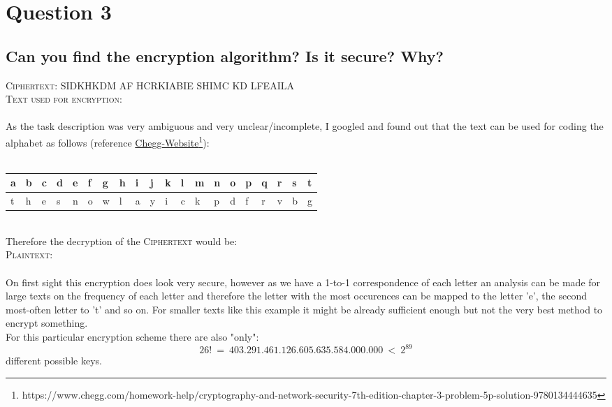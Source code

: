 \documentclass{report}
\begin{document}
	\section{Question 3}
	\startsection
		\renewcommand{\thesubsection}{\thesection.\Alph{subsection}}
		\subsection{Can you find the encryption algorithm? Is it secure? Why?}
		\startsubsection
			\textsc{Ciphertext}: SIDKHKDM AF HCRKIABIE SHIMC KD LFEAILA \\
			\textsc{Text used for encryption}:  \\ \\
			As the task description was very ambiguous and very unclear/incomplete, I googled and found out that the text can be used for coding the alphabet as follows (reference \href{https://www.chegg.com/homework-help/cryptography-and-network-security-7th-edition-chapter-3-problem-5p-solution-9780134444635}{Chegg-Website}\footnote{https://www.chegg.com/homework-help/cryptography-and-network-security-7th-edition-chapter-3-problem-5p-solution-9780134444635}): \\ \\
			\begin{tabular}{|M{0.3cm}|M{0.3cm}|M{0.3cm}|M{0.3cm}|M{0.3cm}|M{0.3cm}|M{0.3cm}|M{0.3cm}|M{0.3cm}|M{0.3cm}|M{0.3cm}|M{0.3cm}|M{0.3cm}|M{0.3cm}|M{0.3cm}|M{0.3cm}|M{0.3cm}|M{0.3cm}|M{0.3cm}|M{0.3cm}|}
				\hline
				a & b & c & d & e & f & g & h & i & j & k & l & m & n & o & p & q & r & s & t \\
				\hline
				t & h & e & s & n & o & w & l & a & y & i & c & k & p & d & f & r & v & b & g \\
				\hline
			\end{tabular}
			\hfill \\
			Therefore the decryption of the \textsc{Ciphertext} would be: \\
			\textsc{Plaintext}:  \\ \\
			On first sight this encryption does look very secure, however as we have a 1-to-1 correspondence of each letter an analysis can be made for large texts on the frequency of each letter and therefore the letter with the most occurences can be mapped to the letter 'e', the second most-often letter to 't' and so on. For smaller texts like this example it might be already sufficient enough but not the very best method to encrypt something. \\
			For this particular encryption scheme there are also "only":
			\[
				26! \ = \ 403.291.461.126.605.635.584.000.000 \ < \ 2^{89}
			\]
			different possible keys.
		\closesection
\end{document}
